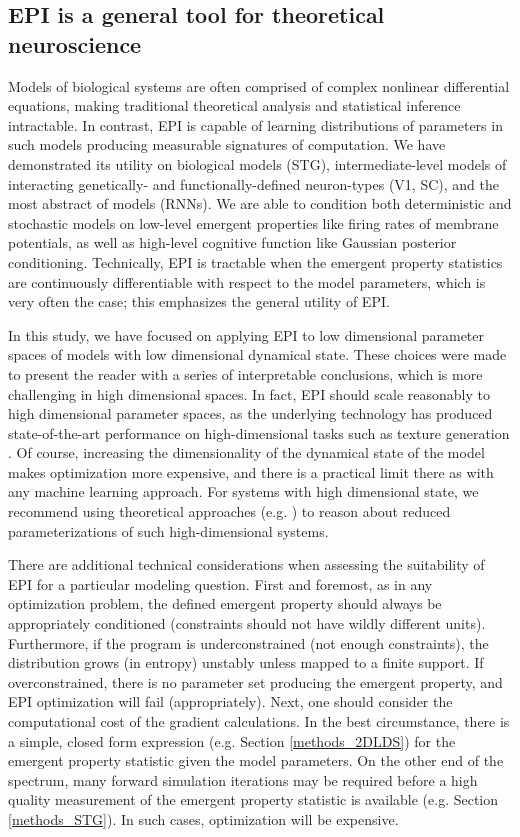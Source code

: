 \documentclass[11pt]{article}
\begin{document}
\subsection{EPI is a general tool for theoretical neuroscience} 
Models of biological systems are often comprised of complex nonlinear differential equations, making traditional theoretical analysis and statistical inference intractable. 
In contrast, EPI is capable of learning distributions of parameters in such models producing measurable signatures of computation.
We have demonstrated its utility on biological models (STG), intermediate-level models of interacting genetically- and functionally-defined neuron-types (V1, SC), and the most abstract of models (RNNs).  
We are able to condition both deterministic and stochastic models on low-level emergent properties like firing rates of membrane potentials, as well as high-level cognitive function like Gaussian posterior conditioning.
Technically, EPI is tractable when the emergent property statistics are continuously differentiable with respect to the model parameters, which is very often the case; this emphasizes the general utility of EPI.

In this study, we have focused on applying EPI to low dimensional parameter spaces of models with low dimensional dynamical state.
These choices were made to present the reader with a series of  interpretable conclusions, which is more challenging in high dimensional spaces.
In fact, EPI should scale reasonably to high dimensional parameter spaces, as the underlying technology has produced state-of-the-art performance on high-dimensional tasks such as texture generation \cite{loaiza2017maximum}.
Of course, increasing the dimensionality of the dynamical state of the model makes optimization more expensive, and there is a practical limit there as with any machine learning approach.
For systems with high dimensional state, we recommend using theoretical approaches (e.g. \cite{mastrogiuseppe2018linking}) to reason about reduced parameterizations of such high-dimensional systems.

There are additional technical considerations when assessing the suitability of EPI for a particular modeling question.  
First and foremost, as in any optimization problem, the defined emergent property should always be appropriately conditioned (constraints should not have wildly different units).  
Furthermore, if the program is underconstrained (not enough constraints), the distribution grows (in entropy) unstably unless mapped to a finite support.  
If overconstrained, there is no parameter set producing the emergent property, and EPI optimization will fail (appropriately).
Next, one should consider the computational cost of the gradient calculations. 
In the best circumstance, there is a simple, closed form expression (e.g. Section \ref{methods_2DLDS}) for the emergent property statistic given the model parameters.  
On the other end of the spectrum, many forward simulation iterations may be required before a high quality measurement of the emergent property statistic is available  (e.g. Section \ref{methods_STG}).  In such cases, optimization will be expensive.
\end{document}
